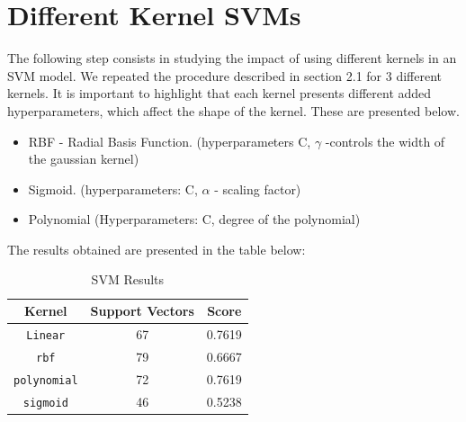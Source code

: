 \documentclass{thesisreport}
\begin{document}
\newpage
 \section{Different Kernel SVMs}
 The following step consists in studying the impact of using different kernels in an SVM model. We repeated the procedure described in section 2.1 for 3 different kernels. It is important to highlight that each kernel presents different added hyperparameters, which affect the shape of the kernel. These are presented below.
 \begin{itemize}
    \item RBF - Radial Basis Function. (hyperparameters C, $\gamma$ -controls the width of the gaussian kernel)
    \item Sigmoid. (hyperparameters: C, $\alpha$ - scaling factor)
    \item Polynomial (Hyperparameters: C, degree of the polynomial)
\end{itemize}

The results obtained are presented in the table below: 
\begin{table}[H]
\centering
\begin{tabular}{|c|c|c|}
\hline
\textbf{Kernel} & \textbf{Support Vectors} & \textbf{Score} \\
\hline
\texttt{Linear} & 67 & 0.7619 \\
\texttt{rbf} & 79 & 0.6667 \\
\texttt{polynomial} & 72 & 0.7619 \\
\texttt{sigmoid} & 46 & 0.5238 \\
\hline
\end{tabular}
\caption{SVM Results}
\label{tab:svm-results}
\end{table}
\end{document}
